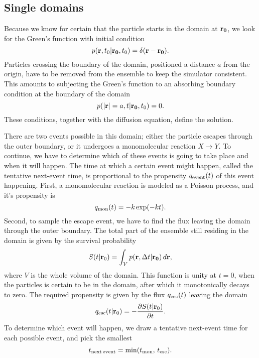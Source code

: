 \subsection{Single domains}
Because we know for certain that the particle starts in the domain at ${\bf r_0}$, we look for the Green's function with initial condition
\begin{equation}
 p({\bf r}, t_0|{\bf r_0},t_0) = \delta(\mathbf{r - r_0}).
\end{equation}
Particles crossing the boundary of the domain, positioned a distance $a$ from the origin, have to be removed from the ensemble to keep the simulator consistent. This amounts to subjecting the Green's function to an absorbing boundary condition at the boundary of the domain
\begin{equation}
 p({\bf |r|}=a, t|{\bf r_0},t_0) = 0.
\end{equation}
These conditions, together with the diffusion equation, define the solution. 

There are two events possible in this domain; either the particle escapes through the outer boundary, or it undergoes a monomolecular reaction $X\rightarrow Y$. To continue, we have to determine which of these events is going to take place and when it will happen. The time at which a certain event might happen, called the tentative next-event time, is proportional to the propensity $q_{\rm event}(t)$ of this event happening. First, a monomolecular reaction is modeled as a Poisson process, and it's propensity is
\begin{equation}
 q_{\rm mon}(t) = -k\, {\rm exp}(-k t).
\end{equation}
Second, to sample the escape event, we have to find the flux leaving the domain through the outer boundary. The total part of the ensemble still residing in the domain is given by the survival probability
\begin{equation}
 S(t|{\mathbf r_0}) = \int_V p({\bf r}, \Delta t|{\bf r_0}) \, d{\mathbf r},
 \elabel{Surv}
\end{equation}
where $V$ is the whole volume of the domain. This function is unity at $t=0$, when the particles is certain to be in the domain, after which it monotonically decays to zero. The required propensity is given by the flux $q_{\rm esc}(t)$ leaving the domain
\begin{equation}
 q_{\rm esc}(t|{\mathbf r_0}) = -\pdiff{S(t|{\mathbf r_0})}{t}.
 \elabel{Sflux}
\end{equation}
To determine which event will happen, we draw a tentative next-event time for each possible event, and pick the smallest
\begin{equation}
 t_{\rm next\,event} = {\rm min}(t_{\rm mon},\,t_{\rm esc}).
\end{equation}

